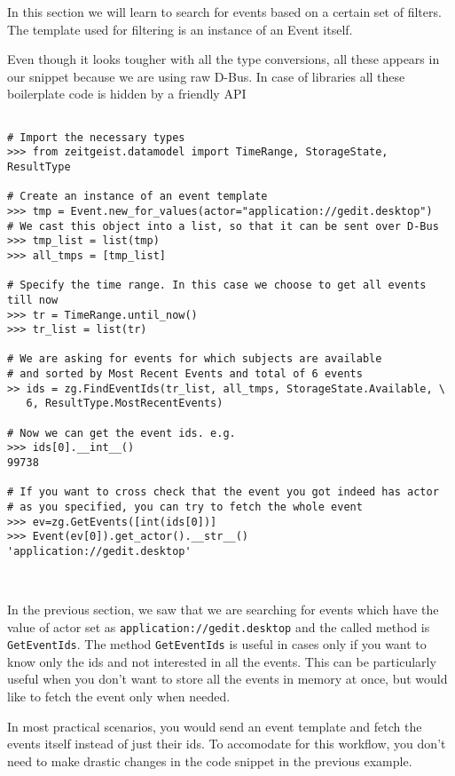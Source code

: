 In this section we will learn to search for events based on a certain set of filters.
The template used for filtering is an instance of an Event itself.

Even though it looks tougher with all the type conversions, all these appears in 
our snippet because we are using raw D-Bus. In case of libraries all these 
boilerplate code is hidden by a friendly API

\begin{center}
\begin{verbatim}

# Import the necessary types
>>> from zeitgeist.datamodel import TimeRange, StorageState, ResultType

# Create an instance of an event template
>>> tmp = Event.new_for_values(actor="application://gedit.desktop")
# We cast this object into a list, so that it can be sent over D-Bus
>>> tmp_list = list(tmp)
>>> all_tmps = [tmp_list]

# Specify the time range. In this case we choose to get all events till now
>>> tr = TimeRange.until_now()
>>> tr_list = list(tr)

# We are asking for events for which subjects are available 
# and sorted by Most Recent Events and total of 6 events
>> ids = zg.FindEventIds(tr_list, all_tmps, StorageState.Available, \
   6, ResultType.MostRecentEvents)

# Now we can get the event ids. e.g.
>>> ids[0].__int__()
99738

# If you want to cross check that the event you got indeed has actor 
# as you specified, you can try to fetch the whole event
>>> ev=zg.GetEvents([int(ids[0])]
>>> Event(ev[0]).get_actor().__str__()
'application://gedit.desktop'



\end{verbatim}
\end{center}

In the previous section, we saw that we are searching for events which have 
the value of actor set as \texttt{application://gedit.desktop} and the called 
method is \texttt{GetEventIds}. The method \texttt{GetEventIds} is useful in 
cases only if you want to know only the ids and not interested in all the events. 
This can be particularly useful when you don't want to store all the events 
in memory at once, but would like to fetch the event only when needed.


In most practical scenarios, you would send an event template and fetch the 
events itself instead of just their ids. To accomodate for this workflow, you 
don't need to make drastic changes in the code snippet in the previous example.


